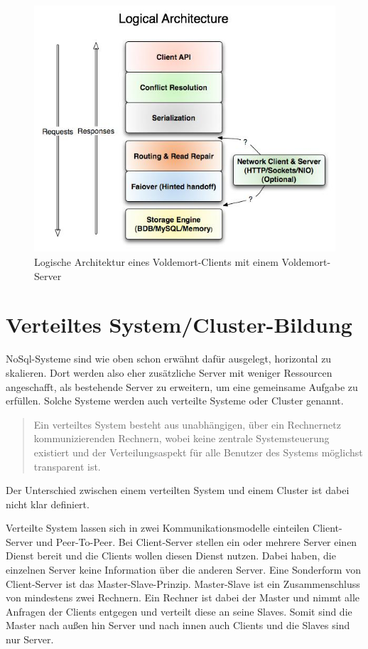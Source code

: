 \begin{figure}
\centering
\includegraphics[scale=0.5]{images/voldemort-architecture.jpeg}
\caption{Logische Architektur eines Voldemort-Clients mit einem Voldemort-Server \cite{Voldemort2017}}
\label{fig:voldemort-logical-architecture}
\end{figure}

\section{Verteiltes System/Cluster-Bildung}
NoSql-Systeme sind wie oben schon erwähnt dafür ausgelegt, horizontal zu
skalieren. Dort werden also eher zusätzliche Server mit weniger Ressourcen
angeschafft, als bestehende Server zu erweitern, um eine gemeinsame Aufgabe zu
erfüllen. Solche Systeme werden auch verteilte Systeme oder Cluster genannt.

\blockquote[\cite{Distener2012}]{Ein verteiltes System besteht aus unabhängigen,
über ein Rechnernetz kommunizierenden Rechnern, wobei keine zentrale
Systemsteuerung existiert und der Verteilungsaspekt für alle Benutzer des
Systems möglichst transparent ist.}

Der Unterschied zwischen einem verteilten System und einem Cluster
ist dabei nicht klar definiert.

Verteilte System lassen sich in zwei Kommunikationsmodelle einteilen
Client-Server und Peer-To-Peer. Bei Client-Server stellen ein oder mehrere
Server einen Dienst bereit und die Clients wollen diesen Dienst nutzen. Dabei
haben, die einzelnen Server keine Information über die anderen Server. Eine
Sonderform von Client-Server ist das Master-Slave-Prinzip. Master-Slave ist ein
Zusammenschluss von mindestens zwei Rechnern. Ein Rechner ist dabei der Master
und nimmt alle Anfragen der Clients entgegen und verteilt diese an seine
Slaves. Somit sind die Master nach außen hin Server und nach innen auch Clients
und die Slaves sind nur Server.

